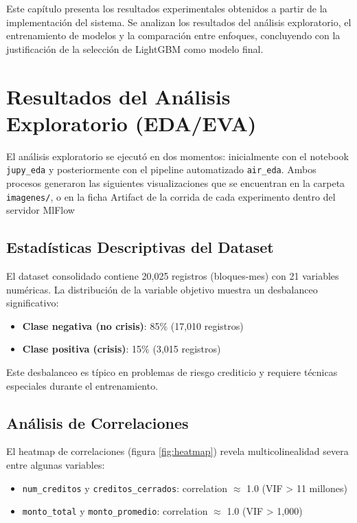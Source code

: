 Este capítulo presenta los resultados experimentales obtenidos a partir de la implementación del sistema. Se analizan los resultados del análisis exploratorio, el entrenamiento de modelos y la comparación entre enfoques, concluyendo con la justificación de la selección de LightGBM como modelo final.

\section{Resultados del Análisis Exploratorio (EDA/EVA)}

El análisis exploratorio se ejecutó en dos momentos: inicialmente con el notebook \texttt{jupy\_eda} y posteriormente con el pipeline automatizado \texttt{air\_eda}. Ambos procesos generaron las siguientes visualizaciones que se encuentran en la carpeta \texttt{imagenes/}, o en la ficha Artifact de la corrida de cada experimento dentro del servidor MlFlow

\subsection{Estadísticas Descriptivas del Dataset}

El dataset consolidado contiene 20,025 registros (bloques-mes) con 21 variables numéricas. La distribución de la variable objetivo muestra un desbalanceo significativo:

\begin{itemize}
    \item \textbf{Clase negativa (no crisis)}: 85\% (17,010 registros)
    \item \textbf{Clase positiva (crisis)}: 15\% (3,015 registros)
\end{itemize}

Este desbalanceo es típico en problemas de riesgo crediticio y requiere técnicas especiales durante el entrenamiento.

\subsection{Análisis de Correlaciones}

El heatmap de correlaciones (figura \ref{fig:heatmap}) revela multicolinealidad severa entre algunas variables:

\begin{itemize}
    \item \texttt{num\_creditos} y \texttt{creditos\_cerrados}: correlation $\approx$ 1.0 (VIF > 11 millones)
    \item \texttt{monto\_total} y \texttt{monto\_promedio}: correlation $\approx$ 1.0 (VIF > 1,000)
\end{itemize}

